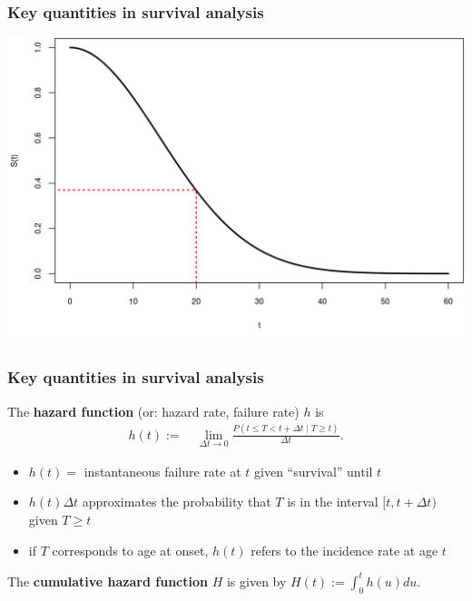 \documentclass[12pt, 
hyperref={colorlinks=true, linkcolor=blue, urlcolor=cyan},dvipsnames]{beamer}
\begin{document}
\begin{frame}
\frametitle{Key quantities in survival analysis}
\hspace*{-0.5cm}\includegraphics[height=0.8\textheight]{figs/survival_function.png}
\end{frame}

\begin{frame}
\frametitle{Key quantities in survival analysis}
The \textbf{hazard function} (or: hazard rate, failure rate) $h$ is \vspace{-0.2cm}
\begin{align*}
h(t) := & \ \lim_{\Delta t \to 0} \frac{P(t \leq T < t + \Delta t \mid T \geq t)}{\Delta t}.
\end{align*}\vspace{-0.8cm}
\begin{itemize}
\item $h(t) = $ instantaneous failure rate at $t$ given ``survival'' until $t$
\item $h(t)\Delta t$ approximates the probability that $T$ is in the interval $[t, t + \Delta t)$ given $T \geq t$
\item if $T$ corresponds to age at onset, $h(t)$ refers to the incidence rate at age $t$
\end{itemize}

The \textbf{cumulative hazard function} $H$ is given by $H(t) := \int_0^t h(u) du$.

\end{frame}
\end{document}
